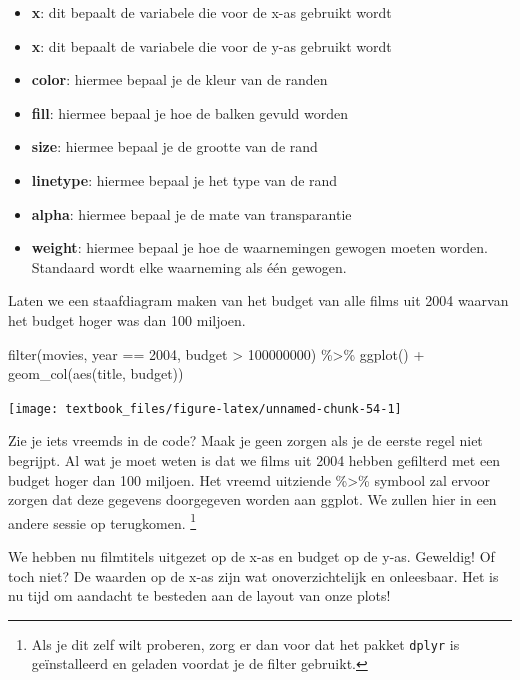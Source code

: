 \documentclass[]{tufte-book}
\newenvironment{Shaded}{}{}
\newcommand{\DecValTok}[1]{\textcolor[rgb]{0.25,0.63,0.44}{#1}}
\newcommand{\FunctionTok}[1]{\textcolor[rgb]{0.02,0.16,0.49}{#1}}
\newcommand{\NormalTok}[1]{#1}
\newcommand{\SpecialCharTok}[1]{\textcolor[rgb]{0.25,0.44,0.63}{#1}}
\providecommand{\tightlist}{%
  \setlength{\itemsep}{0pt}\setlength{\parskip}{0pt}}
\begin{document}
\begin{itemize}
\tightlist
\item
  \textbf{x}: dit bepaalt de variabele die voor de x-as gebruikt wordt
\item
  \textbf{x}: dit bepaalt de variabele die voor de y-as gebruikt wordt
\item
  \textbf{color}: hiermee bepaal je de kleur van de randen
\item
  \textbf{fill}: hiermee bepaal je hoe de balken gevuld worden
\item
  \textbf{size}: hiermee bepaal je de grootte van de rand
\item
  \textbf{linetype}: hiermee bepaal je het type van de rand
\item
  \textbf{alpha}: hiermee bepaal je de mate van transparantie
\item
  \textbf{weight}: hiermee bepaal je hoe de waarnemingen gewogen moeten worden. Standaard wordt elke waarneming als één gewogen.
\end{itemize}

Laten we een staafdiagram maken van het budget van alle films uit 2004 waarvan het budget hoger was dan 100 miljoen.

\begin{Shaded}
\begin{Highlighting}[]
\FunctionTok{filter}\NormalTok{(movies, year }\SpecialCharTok{==} \DecValTok{2004}\NormalTok{, budget }\SpecialCharTok{\textgreater{}} \DecValTok{100000000}\NormalTok{) }\SpecialCharTok{\%\textgreater{}\%}
  \FunctionTok{ggplot}\NormalTok{() }\SpecialCharTok{+}
  \FunctionTok{geom\_col}\NormalTok{(}\FunctionTok{aes}\NormalTok{(title, budget))}
\end{Highlighting}
\end{Shaded}

\texttt{[image: textbook\_files/figure-latex/unnamed-chunk-54-1]}

Zie je iets vreemds in de code? Maak je geen zorgen als je de eerste regel niet begrijpt. Al wat je moet weten is dat we films uit 2004 hebben gefilterd met een budget hoger dan 100 miljoen. Het vreemd uitziende \%\textgreater\% symbool zal ervoor zorgen dat deze gegevens doorgegeven worden aan ggplot. We zullen hier in een andere sessie op terugkomen. \footnote{Als je dit zelf wilt proberen, zorg er dan voor dat het pakket \texttt{dplyr} is geïnstalleerd en geladen voordat je de filter gebruikt.}

We hebben nu filmtitels uitgezet op de x-as en budget op de y-as. Geweldig! Of toch niet? De waarden op de x-as zijn wat onoverzichtelijk en onleesbaar. Het is nu tijd om aandacht te besteden aan de layout van onze plots!
\end{document}
